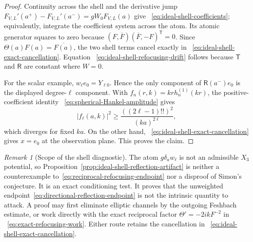 \documentclass[11pt]{article}
\theoremstyle{definition}
\theoremstyle{remark}
\newtheorem{remark}[theorem]{Remark}
\begin{document}
\begin{proof}
Continuity across the shell and the derivative jump
$F_{V,L}'(a^+)-F_{V,L}'(a^-)=gW_0F_{V,L}(a)$ give
~\eqref{eq:ideal-shell-coefficients}; equivalently, integrate the coefficient
system across the atom.  Its atomic generator squares to zero because
$(F,\overline F)(\overline F,-F)^{\mathsf T}=0$.  Since
$\Theta(a)F(a)=\overline{F(a)}$, the two shell terms cancel exactly in
~\eqref{eq:ideal-shell-exact-cancellation}.  Equation
~\eqref{eq:ideal-shell-refocusing-drift} follows because
$\mathsf T$ and $\mathsf R$ are constant where $W=0$.

For the scalar example, $w_\ell e_0=Y_{\ell0}$.  Hence the only component of
$\mathsf R(a^-)e_0$ is the displayed degree-$\ell$ component.  With
$f_n(r,k)=krh_n^{(1)}(kr)$, the positive-coefficient identity
~\eqref{eq:spherical-Hankel-amplitude} gives
\begin{equation}
 |f_\ell(a,k)|^2
 \geq \frac{((2\ell-1)!!)^2}{(ka)^{2\ell}},
\end{equation}
which diverges for fixed $ka$.  On the other hand,
~\eqref{eq:ideal-shell-exact-cancellation} gives $x=e_0$ at the observation
plane.  This proves the claim.
\end{proof}

\begin{remark}[Scope of the shell diagnostic]
The atom $g\delta_a w_\ell$ is not an admissible $X_3$ potential, so
Proposition~\ref{prop:ideal-shell-reflection-artifact} is neither a
counterexample to~\eqref{eq:reciprocal-refocusing-endpoint} nor a disproof of
Simon's conjecture.  It is an exact conditioning test.  It proves that the
unweighted endpoint~\eqref{eq:directional-reflection-endpoint} is not the
intrinsic quantity to attack.  A proof may first eliminate elliptic channels
by the outgoing Feshbach estimate, or work directly with the exact reciprocal
factor $\Theta'=-2ikF^{-2}$ in
~\eqref{eq:exact-refocusing-work}.  Either route retains the cancellation in
~\eqref{eq:ideal-shell-exact-cancellation}.
\end{remark}
\end{document}
